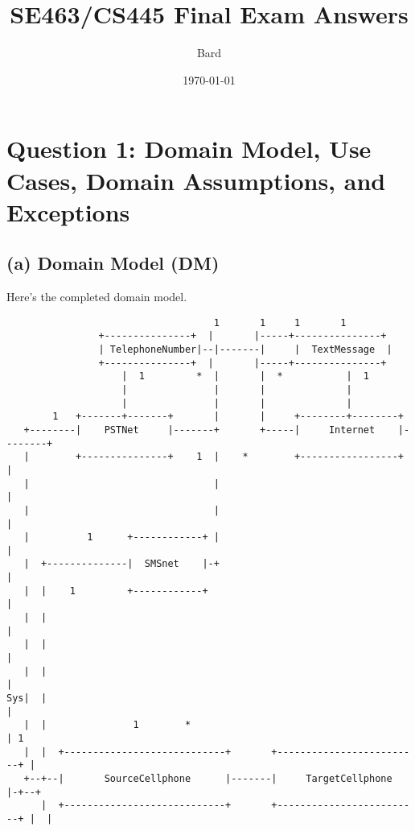 \documentclass{article}
\title{SE463/CS445 Final Exam Answers}
\author{Bard}
\date{\today}
\begin{document}
\maketitle

\section*{Question 1: Domain Model, Use Cases, Domain Assumptions, and Exceptions}

\subsection*{(a) Domain Model (DM)}

Here's the completed domain model.

\begin{center}
\begin{verbatim}
                                    1       1     1       1
                +---------------+  |       |-----+---------------+
                | TelephoneNumber|--|-------|     |  TextMessage  |
                +---------------+  |       |-----+---------------+
                    |  1         *  |       |  *           |  1
                    |               |       |              |
                    |               |       |              |
        1   +-------+-------+       |       |     +--------+--------+
   +--------|    PSTNet     |-------+       +-----|     Internet    |--------+
   |        +---------------+    1  |    *        +-----------------+        |
   |                                |                                       |
   |                                |                                       |
   |          1      +------------+ |                                       |
   |  +--------------|  SMSnet    |-+                                       |
   |  |    1         +------------+                                        |
   |  |                                                                    |
   |  |                                                                    |
   |  |                                                                    |
Sys|  |                                                                    |
   |  |               1        *                                           | 1
   |  |  +----------------------------+       +-------------------------+ |
   +--+--|       SourceCellphone      |-------|     TargetCellphone     |-+--+
      |  +----------------------------+       +-------------------------+ |  |

\end{verbatim}
\end{center}
\end{document}
